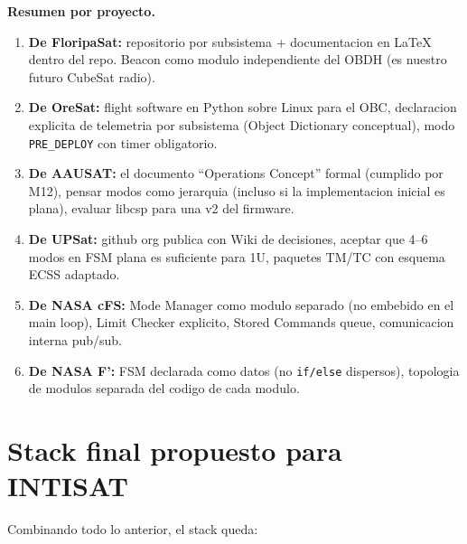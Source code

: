 \documentclass[11pt,a4paper,oneside,openright]{book}
\begin{document}
\textbf{Resumen por proyecto.}

\begin{enumerate}[leftmargin=2em]
  \item \textbf{De FloripaSat:} repositorio por subsistema +
    documentacion en LaTeX dentro del repo. Beacon como modulo
    independiente del OBDH (es nuestro futuro CubeSat radio).
  \item \textbf{De OreSat:} flight software en Python sobre Linux
    para el OBC, declaracion explicita de telemetria por
    subsistema (Object Dictionary conceptual), modo
    \texttt{PRE\_DEPLOY} con timer obligatorio.
  \item \textbf{De AAUSAT:} el documento ``Operations Concept''
    formal (cumplido por M12), pensar modos como jerarquia (incluso
    si la implementacion inicial es plana), evaluar libcsp para
    una v2 del firmware.
  \item \textbf{De UPSat:} github org publica con Wiki de decisiones,
    aceptar que 4--6 modos en FSM plana es suficiente para 1U,
    paquetes TM/TC con esquema ECSS adaptado.
  \item \textbf{De NASA cFS:} Mode Manager como modulo separado
    (no embebido en el main loop), Limit Checker explicito, Stored
    Commands queue, comunicacion interna pub/sub.
  \item \textbf{De NASA F':} FSM declarada como datos (no
    \texttt{if/else} dispersos), topologia de modulos separada del
    codigo de cada modulo.
\end{enumerate}

\section{Stack final propuesto para INTISAT}

Combinando todo lo anterior, el stack queda:
\end{document}
